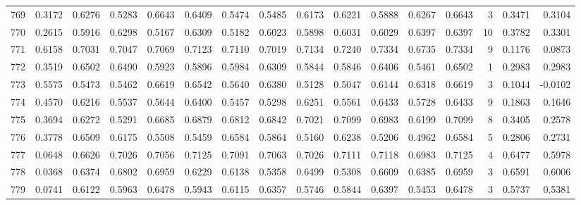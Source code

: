 \begin{tabular}{lrrrrrrrrrrrrrrr}
769 &      0.3172 &  0.6276 &  0.5283 &  0.6643 &  0.6409 &  0.5474 &  0.5485 &  0.6173 &  0.6221 &  0.5888 &   0.6267 &     0.6643 &      3 &                    0.3471 &                     0.3104 \\
770 &      0.2615 &  0.5916 &  0.6298 &  0.5167 &  0.6309 &  0.5182 &  0.6023 &  0.5898 &  0.6031 &  0.6029 &   0.6397 &     0.6397 &     10 &                    0.3782 &                     0.3301 \\
771 &      0.6158 &  0.7031 &  0.7047 &  0.7069 &  0.7123 &  0.7110 &  0.7019 &  0.7134 &  0.7240 &  0.7334 &   0.6735 &     0.7334 &      9 &                    0.1176 &                     0.0873 \\
772 &      0.3519 &  0.6502 &  0.6490 &  0.5923 &  0.5896 &  0.5984 &  0.6309 &  0.5844 &  0.5846 &  0.6406 &   0.5461 &     0.6502 &      1 &                    0.2983 &                     0.2983 \\
773 &      0.5575 &  0.5473 &  0.5462 &  0.6619 &  0.6542 &  0.5640 &  0.6380 &  0.5128 &  0.5047 &  0.6144 &   0.6318 &     0.6619 &      3 &                    0.1044 &                    -0.0102 \\
774 &      0.4570 &  0.6216 &  0.5537 &  0.5644 &  0.6400 &  0.5457 &  0.5298 &  0.6251 &  0.5561 &  0.6433 &   0.5728 &     0.6433 &      9 &                    0.1863 &                     0.1646 \\
775 &      0.3694 &  0.6272 &  0.5291 &  0.6685 &  0.6879 &  0.6812 &  0.6842 &  0.7021 &  0.7099 &  0.6983 &   0.6199 &     0.7099 &      8 &                    0.3405 &                     0.2578 \\
776 &      0.3778 &  0.6509 &  0.6175 &  0.5508 &  0.5459 &  0.6584 &  0.5864 &  0.5160 &  0.6238 &  0.5206 &   0.4962 &     0.6584 &      5 &                    0.2806 &                     0.2731 \\
777 &      0.0648 &  0.6626 &  0.7026 &  0.7056 &  0.7125 &  0.7091 &  0.7063 &  0.7026 &  0.7111 &  0.7118 &   0.6983 &     0.7125 &      4 &                    0.6477 &                     0.5978 \\
778 &      0.0368 &  0.6374 &  0.6802 &  0.6959 &  0.6229 &  0.6138 &  0.5358 &  0.6499 &  0.5308 &  0.6609 &   0.6385 &     0.6959 &      3 &                    0.6591 &                     0.6006 \\
779 &      0.0741 &  0.6122 &  0.5963 &  0.6478 &  0.5943 &  0.6115 &  0.6357 &  0.5746 &  0.5844 &  0.6397 &   0.5453 &     0.6478 &      3 &                    0.5737 &                     0.5381 \\

\end{tabular}
